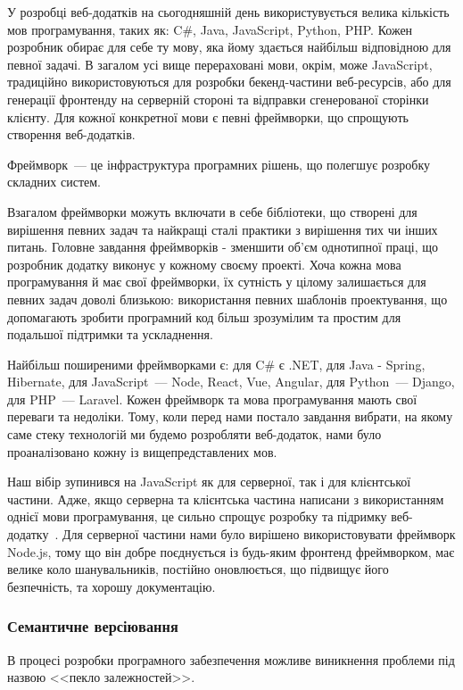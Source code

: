У розробці веб-додатків на сьогодняшній день використувується велика кількість мов програмування, таких як: C\#, Java, JavaScript, Python, PHP. Кожен розробник обирає для себе ту мову, яка йому здається найбільш відповідною для певної задачі. В загалом усі вище перераховані мови, окрім, може JavaScript, традиційно використовуються для розробки бекенд-частини веб-ресурсів, або для генерації фронтенду на серверній стороні та відправки сгенерованої сторінки клієнту. Для кожної конкретної мови є певні фреймворки, що спрощують створення веб-додатків.

Фреймворк~--- це інфраструктура програмних рішень, що полегшує розробку складних систем.

Взагалом фреймворки можуть включати в себе бібліотеки, що створені для вирішення певних задач та найкращі сталі практики з вирішення тих чи інших питань. Головне завдання фреймворків - зменшити об'єм однотипної праці, що розробник додатку виконує у кожному своєму проекті. Хоча кожна мова програмування й має свої фреймворки, їх сутність у цілому залишається для певних задач доволі близькою: використання певних шаблонів проектування, що допомагають зробити програмний код більш зрозумілим та простим для подальшої підтримки та ускладнення.

Найбільш поширеними фреймворками є: для C\# є .NET, для Java - Spring, Hibernate, для JavaScript~--- Node, React, Vue, Angular, для Python~--- Django, для PHP~--- Laravel. Кожен фреймворк та мова програмування мають свої переваги та недоліки. Тому, коли перед нами постало завдання вибрати, на якому саме стеку технологій ми будемо розробляти веб-додаток, нами було проаналізовано кожну із вищепредставлених мов.

Наш вібір зупинився на JavaScript як для серверної, так і для клієнтської частини. Адже, якщо серверна та клієнтська частина написани з використанням однієї мови програмування, це сильно спрощує розробку та підримку веб-додатку~\cite{vedantani2017}. Для серверної частини нами було вирішено використовувати фреймворк Node.js, тому що він добре поєднується із будь-яким фронтенд фреймворком, має велике коло шанувальників, постійно оновлюється, що підвищує його безпечність, та хорошу документацію.  

\subsubsection{Семантичне версіювання}

В процесі розробки програмного забезпечення можливе виникнення проблеми під назвою <<пекло залежностей>>. 


